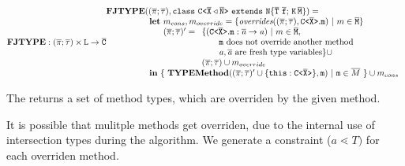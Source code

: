 \documentclass[a4paper,USenglish,cleveref, autoref, thm-restate]{lipics-v2021}
\begin{document}
\noindent
$\fjtype : \typeAssumptions \times \texttt{L} \rightarrow \ol{C}\\
 \begin{array}{@{}l@{}l}
  \fjtype & (\typeAssumptions, \mathtt{class } \ \exptype{C}{\ol{X} \triangleleft \ol{N}} \ \mathtt{ extends } \ \mathtt{N \{ \overline{T} \ \overline{f}; \, K \, \overline{M} \}}) =\\
  & \begin{array}{l@{}l@{}l}
    \textbf{let} &\ m_{cons}, m_{override} = \set{\overridesFunc(\typeAssumptions, \exptype{C}{\ol{X}}.\mathtt{m}) \ |\ m \in \ol{M}} \\
    &\ \typeAssumptions' = \begin{array}[t]{l}
     \set{ (\exptype{C}{\ol{X}}.\mathtt{m} : \ol{\tv{a}} \to \tv{a}) \ |\ m \in \ol{M},\\
     \quad \quad \texttt{m}\ \text{does not override another method} \\
     \quad \quad \tv{a}, \ol{\tv{a}}\ \text{are fresh type variables} } \cup \\
     \typeAssumptions \cup m_{override}
    \end{array}\\
  \textbf{in} & \{ \ \typeMethod( \typeAssumptions' \cup \{ \mathtt{this} : \exptype{C}{\ol{X}} \}, \mathtt{m}) \ |\ \mathtt{m} \in \overline{M} \ \} \cup m_{cons} \\ 
  \end{array}
\end{array}$

The \overridesFunc{} returns a set of method types, which are overriden by the given method.

It is possible that mulitple methods get overriden, due to the internal use of intersection types during the \fjtype{} algorithm.
We generate a constraint ($a\lessdot T)$ for each overriden method.
\end{document}
